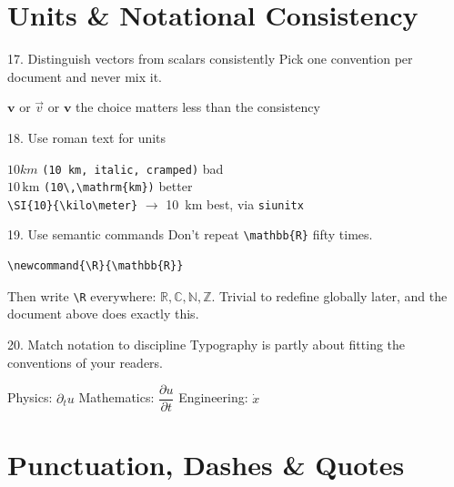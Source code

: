 \documentclass[11pt]{article}
\newcommand{\R}{\mathbb{R}}
\newcommand{\C}{\mathbb{C}}
\newcommand{\N}{\mathbb{N}}
\newcommand{\Z}{\mathbb{Z}}
\begin{document}
\section{Units \& Notational Consistency}

\begin{tipbox}{17. Distinguish vectors from scalars consistently}
Pick one convention per document and never mix it.
\end{tipbox}
\begin{center}
$\mathbf{v}$ \quad or \quad $\vec{v}$ \quad or \quad $\boldsymbol{v}$ \hfill the choice matters less than the consistency
\end{center}

\begin{tipbox}{18. Use roman text for units}
\end{tipbox}
\begin{center}
$10 km$ \texttt{(10 km, italic, cramped)} \hfill bad\\
$10\,\mathrm{km}$ \texttt{(10\textbackslash,\textbackslash mathrm\{km\})} \hfill better\\
\verb|\SI{10}{\kilo\meter}| $\to$ \SI{10}{\kilo\meter} \hfill best, via \texttt{siunitx}
\end{center}

\begin{tipbox}{19. Use semantic commands}
Don't repeat \texttt{\textbackslash mathbb\{R\}} fifty times.
\end{tipbox}
\begin{goodcode}
\begin{verbatim}
\newcommand{\R}{\mathbb{R}}
\end{verbatim}
Then write \texttt{\textbackslash R} everywhere: $\R, \C, \N, \Z$. Trivial to
redefine globally later, and the document above does exactly this.
\end{goodcode}

\begin{tipbox}{20. Match notation to discipline}
Typography is partly about fitting the conventions of your readers.
\end{tipbox}
\begin{center}
Physics: $\partial_t u$ \qquad Mathematics: $\dfrac{\partial u}{\partial t}$ \qquad Engineering: $\dot{x}$
\end{center}

\section{Punctuation, Dashes \& Quotes}
\end{document}
